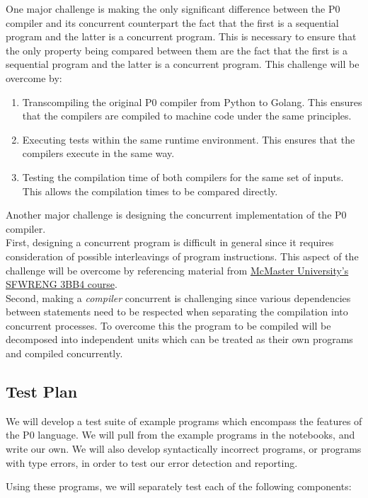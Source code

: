 \documentclass{article}
\begin{document}
One major challenge is making the only significant difference between the P0 compiler
and its concurrent counterpart the fact that the first is a sequential program and the
latter is a concurrent program. This is necessary to ensure that the only property being
compared between them are the fact that the first is a sequential program and the
latter is a concurrent program. This challenge will be 
overcome by:
\begin{enumerate}
	\item Transcompiling the original P0 compiler from Python to Golang. This ensures that the
	compilers are compiled to machine code under the same principles.
	\item Executing tests within the same runtime environment. This ensures that the compilers
	execute in the same way.%
	\item Testing the compilation time of both compilers for the same set of inputs. This allows
	the compilation times to be compared directly.
\end{enumerate}
\bigskip
Another major challenge is designing the concurrent implementation of the P0 compiler.\\
First, designing a concurrent program is difficult in general since it requires consideration of possible interleavings of program instructions. This aspect of the challenge will be overcome by referencing  material from \href{https://www.cas.mcmaster.ca/~se3bb4/}{McMaster University's SFWRENG 3BB4 course}.\\
Second, making a \textit{compiler} concurrent is challenging since various dependencies between statements need to be respected when separating the compilation into concurrent processes. To overcome this the program to be compiled will be decomposed into independent units which can be treated as their own programs and compiled concurrently.

\subsection{Test Plan} %

We will develop a test suite of example programs which encompass the features of
the P0 language. We will pull from the example programs in the notebooks, and
write our own.
We will also develop syntactically incorrect programs, or programs with type
errors, in order to test our error detection and reporting.

Using these programs, we will separately test each of the following components:
\end{document}
